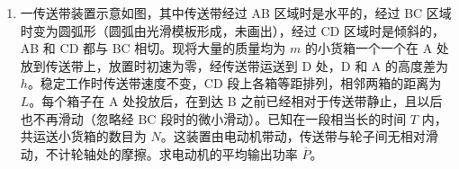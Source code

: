 \documentclass[\gkver]{gaokaozhenti}
\begin{document}
\begin{enumerate}
{$\Delta S=\left[(x-v_{2}\Delta t)+v_{1}\Delta t\right]l-lx=(v_{1}-v_{2})l\Delta t$

由法拉第电磁感应定律，回路中的感应电动势

$E=B\frac{\Delta S}{\Delta t}$

回路中的电流

$I=\frac{E}{2R}$

杆甲的运动方程

$F-BlI=ma$

由于作用于杆甲和杆乙的安培力总是大小相等、方向相反，所以两杆的动量（$t=0$ 时为 0）等于外力 $F$ 的冲量

$Ft=mv_{1}+mv_{2}$

联立以上各式解得

$v_{1}=\frac{1}{2}\left[\frac{Ft}{m}+\frac{2R}{B^{2}l^{2}}(F-ma)\right]$

$v_{2}=\frac{1}{2}\left[\frac{Ft}{m}-\frac{2R}{B^{2}l^{2}}(F-ma)\right]$

代入数据得

$v_{1}=8.15\Ums$，$v_{2}=1.85\Ums$。
}

\item
一传送带装置示意如图，其中传送带经过 AB 区域时是水平的，经过 BC 区域时变为圆弧形（圆弧由光滑模板形成，未画出），经过 CD 区域时是倾斜的，AB 和 CD 都与 BC 相切。现将大量的质量均为 $m$ 的小货箱一个一个在 A 处放到传送带上，放置时初速为零，经传送带运送到 D 处，D 和 A 的高度差为 $h$。稳定工作时传送带速度不变，CD 段上各箱等距排列，相邻两箱的距离为 $L$。每个箱子在 A 处投放后，在到达 B 之前已经相对于传送带静止，且以后也不再滑动（忽略经 BC 段时的微小滑动）。已知在一段相当长的时间 $T$ 内，共运送小货箱的数目为 $N$。这装置由电动机带动，传送带与轮子间无相对滑动，不计轮轴处的摩擦。求电动机的平均输出功率 $\overline{P}$。


\end{enumerate}
\end{document}
